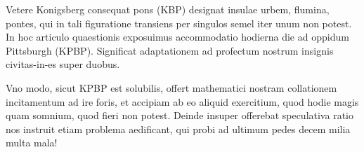 \documentclass[twocolumn]{article}
\theoremstyle{plain}  %
\theoremstyle{definition}  %
\theoremstyle{remark}  %
\begin{document}
Vetere Konigsberg consequat pons (KBP) designat insulae urbem, flumina, pontes, qui in tali figuratione transiens per singulos semel iter unum non potest.
In hoc articulo quaestionis exposuimus accommodatio hodierna die ad oppidum Pittsburgh (KPBP).
Significat adaptationem ad profectum nostrum insignis civitas-in-es super duobus.

Vno modo, sicut KPBP est solubilis, offert mathematici nostram collationem incitamentum ad ire foris, et accipiam ab eo aliquid exercitium, quod hodie magis quam somnium, quod fieri non potest.
Deinde insuper offerebat speculativa ratio nos instruit etiam problema aedificant, qui probi ad ultimum pedes decem milia multa mala!



\end{document}
